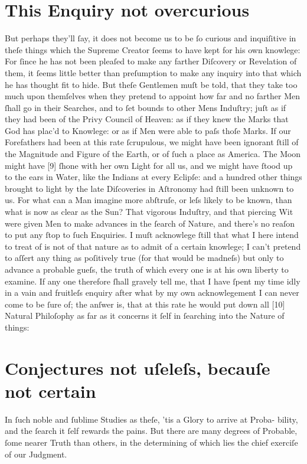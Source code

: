 \documentclass[letterpaper]{book}
\begin{document}
\section{This Enquiry not overcurious}

But perhaps they'll ſay, it does not become us to be ſo curious and
inquiſitive in theſe things which the Supreme Creator ſeems to have kept for
his own knowlege: For ſince he has not been pleaſed to make any farther
Diſcovery or Revelation of them, it ſeems little better than preſumption to
make any inquiry into that which he has thought fit to hide. But theſe
Gentlemen muſt be told, that they take too much upon themſelves when they
pretend to appoint how far and no farther Men ſhall go in their Searches,
and to ſet bounds to other Mens Induſtry; juſt as if they had been of the
Privy Council of Heaven: as if they knew the Marks that God has plac'd to
Knowlege: or as if Men were able to paſs thoſe Marks. If our Forefathers had
been at this rate ſcrupulous, we might have been ignorant ſtill of the
Magnitude and Figure of the Earth, or of ſuch a place as America. The Moon
might have [9] ſhone with her own Light for all us, and we might have ſtood
up to the ears in Water, like the Indians at every Eclipſe: and a hundred
other things brought to light by the late Diſcoveries in Aſtronomy had ſtill
been unknown to us. For what can a Man imagine more abſtruſe, or leſs likely
to be known, than what is now as clear as the Sun? That vigorous Induſtry,
and that piercing Wit were given Men to make advances in the ſearch of
Nature, and there's no reaſon to put any ſtop to ſuch Enquiries. I muſt
acknowlege ſtill that what I here intend to treat of is not of that nature
as to admit of a certain knowlege; I can't pretend to aſſert any thing as
poſitively true (for that would be madneſs) but only to advance a probable
gueſs, the truth of which every one is at his own liberty to examine. If any
one therefore ſhall gravely tell me, that I have ſpent my time idly in a
vain and fruitleſs enquiry after what by my own acknowlegement I can never
come to be ſure of; the anſwer is, that at this rate he would put down all
[10] Natural Philoſophy as far as it concerns it ſelf in ſearching into the
Nature of things:


\section{Conjectures not uſeleſs, becauſe not certain}

In ſuch noble and ſublime Studies as theſe, 'tis a Glory to arrive at Proba-
bility, and the ſearch it ſelf rewards the pains. But there are many degrees
of Probable, ſome nearer Truth than others, in the determining of which lies
the chief exerciſe of our Judgment.
\end{document}
